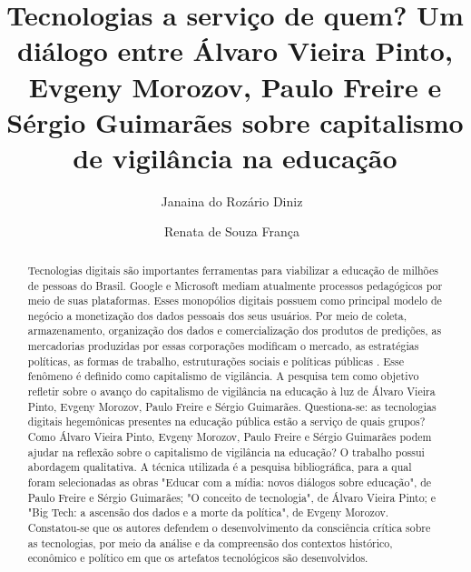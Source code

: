 \documentclass[portuguese]{textolivre}
\title{Tecnologias a serviço de quem? Um diálogo entre Álvaro Vieira Pinto, Evgeny Morozov, Paulo Freire e Sérgio Guimarães sobre capitalismo de vigilância na educação}
\author[1]{Janaina do Rozário Diniz~\orcid{0000-0001-7993-5447}}
\author[1]{Renata de Souza França~\orcid{0000-0002-3809-0975}}
\affil[1]{Universidade do Estado de Minas Gerais, Departamento de Ciências Humanas e Fundamentos da Educação, Ibirité, Minas Gerais, Brasil.}
\begin{document}
\maketitle

\begin{polyabstract}
\begin{abstract}
Tecnologias digitais são importantes ferramentas para viabilizar a educação de milhões de pessoas do Brasil. Google e Microsoft mediam atualmente processos pedagógicos por meio de suas plataformas. Esses monopólios digitais possuem como principal modelo de negócio a monetização dos dados pessoais dos seus usuários. Por meio de coleta, armazenamento, organização dos dados e comercialização dos produtos de predições, as mercadorias produzidas por essas corporações modificam o mercado, as estratégias políticas, as formas de trabalho, estruturações sociais e políticas públicas \cite{cruz_neoliberalismo_2020}. Esse fenômeno é definido como capitalismo de vigilância. A pesquisa tem como objetivo refletir sobre o avanço do capitalismo de vigilância na educação à luz de Álvaro Vieira Pinto, Evgeny Morozov, Paulo Freire e Sérgio Guimarães. Questiona-se: as tecnologias digitais hegemônicas presentes na educação pública estão a serviço de quais grupos? Como Álvaro Vieira Pinto, Evgeny Morozov, Paulo Freire e Sérgio Guimarães podem ajudar na reflexão sobre o capitalismo de vigilância na educação? O trabalho possui abordagem qualitativa. A técnica utilizada é a pesquisa bibliográfica, para a qual foram selecionadas as obras "Educar com a mídia: novos diálogos sobre educação", de Paulo Freire e Sérgio Guimarães; "O conceito de tecnologia", de Álvaro Vieira Pinto; e "Big Tech: a ascensão dos dados e a morte da política", de Evgeny Morozov. Constatou-se que os autores defendem o desenvolvimento da consciência crítica sobre as tecnologias, por meio da análise e da compreensão dos contextos histórico, econômico e político em que os artefatos tecnológicos são desenvolvidos.

\end{abstract}


\end{polyabstract}
\end{document}
